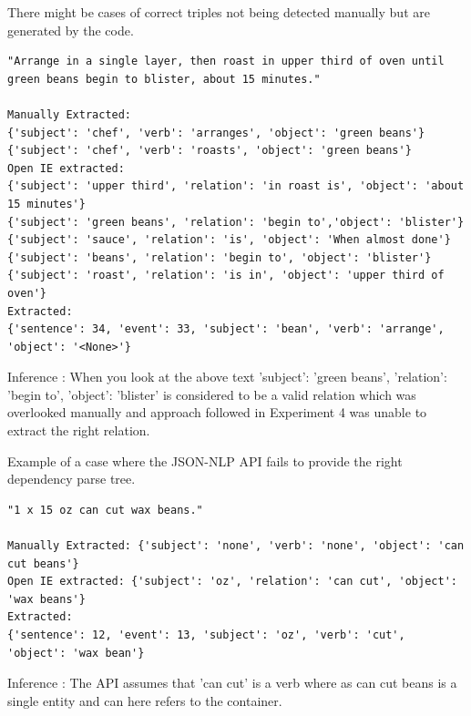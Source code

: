 \documentclass[11pt,letterpaper]{article}
\begin{document}
\noindent There might be cases of correct triples not being detected manually but are generated by the code.
\begin{verbatim}
"Arrange in a single layer, then roast in upper third of oven until 
green beans begin to blister, about 15 minutes."

Manually Extracted: 
{'subject': 'chef', 'verb': 'arranges', 'object': 'green beans'}
{'subject': 'chef', 'verb': 'roasts', 'object': 'green beans'}
Open IE extracted: 
{'subject': 'upper third', 'relation': 'in roast is', 'object': 'about 15 minutes'}
{'subject': 'green beans', 'relation': 'begin to','object': 'blister'}
{'subject': 'sauce', 'relation': 'is', 'object': 'When almost done'}
{'subject': 'beans', 'relation': 'begin to', 'object': 'blister'}
{'subject': 'roast', 'relation': 'is in', 'object': 'upper third of oven'}
Extracted: 
{'sentence': 34, 'event': 33, 'subject': 'bean', 'verb': 'arrange', 'object': '<None>'}
\end{verbatim}

Inference : When you look at the above text {'subject': 'green beans', 'relation': 'begin to', 'object': 'blister'} is considered to be a valid relation which was overlooked manually and approach followed in Experiment 4 was unable to extract the right relation.
\newline

\noindent Example of a case where the JSON-NLP API fails to provide the right dependency parse tree.
\begin{verbatim}
"1 x 15 oz can cut wax beans."

Manually Extracted: {'subject': 'none', 'verb': 'none', 'object': 'can cut beans'}
Open IE extracted: {'subject': 'oz', 'relation': 'can cut', 'object': 'wax beans'}
Extracted: 
{'sentence': 12, 'event': 13, 'subject': 'oz', 'verb': 'cut', 'object': 'wax bean'}
\end{verbatim}

Inference : The API assumes that 'can cut' is a verb where as can cut beans is a single entity and can here refers to the container.
\end{document}
